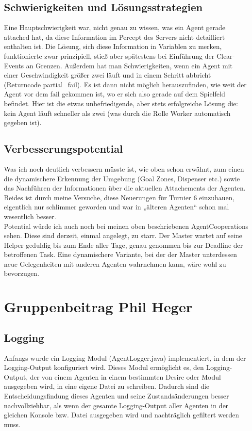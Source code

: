 \documentclass[runningheads]{llncs}
\begin{document}
\subsection{Schwierigkeiten und Lösungsstrategien}
Eine Hauptschwierigkeit war, nicht genau zu wissen, was ein Agent gerade attached hat, da diese Information im Percept des Servers nicht detailliert enthalten ist. Die Lösung, sich diese Information in Variablen zu merken, funktionierte zwar prinzipiell, stieß aber spätestens bei Einführung der Clear-Events an Grenzen. Außerdem hat man Schwierigkeiten, wenn ein Agent mit einer Geschwindigkeit größer zwei läuft und in einem Schritt abbricht (Returncode partial\_fail). Es ist dann nicht möglich herauszufinden, wie weit der Agent vor dem fail gekommen ist, wo er sich also gerade auf dem Spielfeld befindet. Hier ist die etwas unbefriedigende, aber stets erfolgreiche Lösung die: kein Agent läuft schneller als zwei (was durch die Rolle Worker automatisch gegeben ist). 

\subsection{Verbesserungspotential}
Was ich noch deutlich verbessern müsste ist, wie oben schon erwähnt, zum einen die dynamischere Erkennung der Umgebung (Goal Zones, Dispenser etc.) sowie das Nachführen der Informationen über die aktuellen Attachements der Agenten. Beides ist durch meine Versuche, diese Neuerungen für Turnier 6 einzubauen, eigentlich nur schlimmer geworden und war in „älteren Agenten“ schon mal wesentlich besser.\\

Potential würde ich auch noch bei meinen oben beschriebenen AgentCooperations sehen. Diese sind derzeit, einmal angelegt, zu starr. Der Master wartet auf seine Helper geduldig bis zum Ende aller Tage, genau genommen bis zur Deadline der betroffenen Task. Eine dynamischere Variante, bei der der Master unterdessen neue Gelegenheiten mit anderen Agenten wahrnehmen kann, wäre wohl zu bevorzugen.  

\section{Gruppenbeitrag Phil Heger}
\subsection{Logging}
Anfangs wurde ein Logging-Modul (AgentLogger.java) implementiert, in dem der Logging-Output konfiguriert wird. Dieses Modul ermöglicht es, den Logging-Output, der von einem Agenten in einem bestimmten Desire oder Modul ausgegeben wird, in eine eigene Datei zu schreiben. Dadurch sind die Entscheidungsfindung dieses Agenten und seine Zustandsänderungen besser nachvollziehbar, als wenn der gesamte Logging-Output aller Agenten in der gleichen Konsole bzw. Datei ausgegeben wird und nachträglich gefiltert werden muss. 
\end{document}
